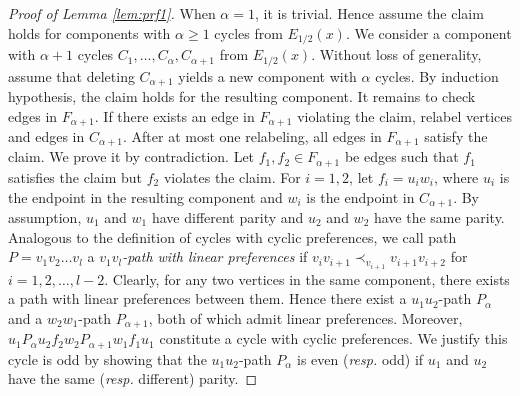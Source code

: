 \documentclass[11pt]{article}
\numberwithin{theorem}{section}
\begin{document}
\begin{proof}[Proof of Lemma \ref{lem:prf1}]
When $\alpha=1$, it is trivial.
Hence assume the claim holds for components with $\alpha\geq 1$ cycles from $E_{1/2}(x)$. We consider a component with $\alpha +1$ cycles $C_1, \ldots, C_{\alpha}, C_{\alpha+1}$ from $E_{1/2}(x)$.
Without loss of generality, assume that deleting $C_{\alpha+1}$ yields a new component with $\alpha$ cycles.
By induction hypothesis, the claim holds for the resulting component.
It remains to check edges in $F_{\alpha+1}$. If there exists an edge in $F_{\alpha+1}$ violating the claim, relabel vertices and edges in $C_{\alpha+1}$. After at most one relabeling, all edges in $F_{\alpha+1}$ satisfy the claim. We prove it by contradiction. Let $f_1,f_2 \in F_{\alpha +1}$ be edges such that $f_1$ satisfies the claim but $f_2$ violates the claim. For $i=1,2$, let $f_i=u_i w_i$, where $u_i$ is the endpoint in the resulting component and $w_i$ is the endpoint in $C_{\alpha+1}$. By assumption, $u_1$ and $w_1$ have different parity and $u_2$ and $w_2$ have the same parity.
Analogous to the definition of cycles with cyclic preferences, we call path $P=v_1 v_2 \ldots v_l$ a \textit{$v_1 v_l$-path with linear preferences} if $v_iv_{i+1}\prec_{v_{i+1}}v_{i+1}v_{i+2}$ for $i=1,2,\ldots,l-2$. Clearly, for any two vertices in the same component, there exists a path with linear preferences between them.
Hence there exist a $u_1 u_2$-path $P_\alpha$ and a $w_2 w_1$-path $P_{\alpha+1}$, both of which admit linear preferences.
Moreover, $u_1 P_\alpha u_2 f_2 w_2 P_{\alpha+1} w_1 f_1 u_1$ constitute a cycle with cyclic preferences. We justify this cycle is odd by
showing that the $u_1 u_2$-path $P_\alpha$ is even (\textit{resp.} odd) if $u_1$ and $u_2$ have the same (\textit{resp.} different) parity.


\end{proof}
\end{document}
